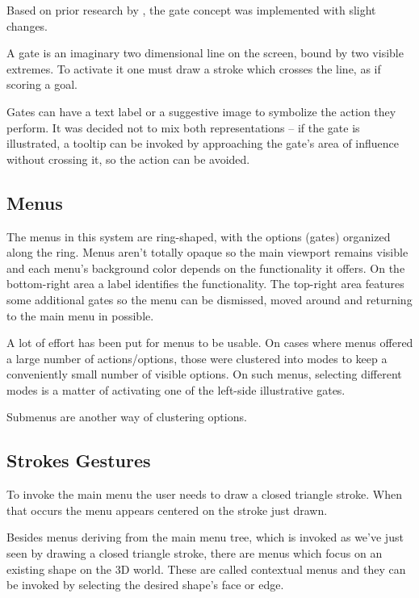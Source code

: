 Based on prior research by \cite{CROSSY}, the gate concept was implemented with slight changes.

A gate is an imaginary two dimensional line on the screen, bound by two visible extremes.
To activate it one must draw a stroke which crosses the line, as if scoring a goal.

Gates can have a text label or a suggestive image to symbolize the action they perform.
It was decided not to mix both representations -- if the gate is illustrated, a tooltip can be invoked
by approaching the gate's area of influence without crossing it, so the action can be avoided.



\subsection{Menus}

The menus in this system are ring-shaped, with the options (gates) organized along the ring.
Menus aren't totally opaque so the main viewport remains visible and each menu's background color
depends on the functionality it offers. On the bottom-right area a label identifies the functionality.
The top-right area features some additional gates so the menu can be dismissed, moved around and
returning to the main menu in possible.

A lot of effort has been put for menus to be usable. On cases where menus offered a large number of actions/options,
those were clustered into modes to keep a conveniently small number of visible options.
On such menus, selecting different modes is a matter of activating one of the left-side illustrative gates.

Submenus are another way of clustering options. 




\subsection{Strokes Gestures}

To invoke the main menu the user needs to draw a closed triangle stroke.
When that occurs the menu appears centered on the stroke just drawn.


Besides menus deriving from the main menu tree, which is invoked as we've just seen by drawing a closed triangle stroke,
there are menus which focus on an existing shape on the 3D world.
These are called contextual menus and they can be invoked by selecting the desired shape's face or edge.

